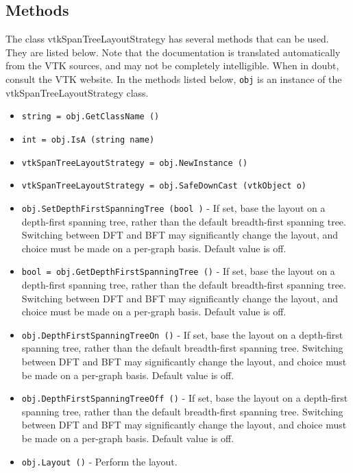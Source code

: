 \subsection{Methods}

The class vtkSpanTreeLayoutStrategy has several methods that can be used.
  They are listed below.
Note that the documentation is translated automatically from the VTK sources,
and may not be completely intelligible.  When in doubt, consult the VTK website.
In the methods listed below, \verb|obj| is an instance of the vtkSpanTreeLayoutStrategy class.
\begin{itemize}
\item  \verb|string = obj.GetClassName ()|

\item  \verb|int = obj.IsA (string name)|

\item  \verb|vtkSpanTreeLayoutStrategy = obj.NewInstance ()|

\item  \verb|vtkSpanTreeLayoutStrategy = obj.SafeDownCast (vtkObject o)|

\item  \verb|obj.SetDepthFirstSpanningTree (bool )| -  If set, base the layout on a depth-first spanning tree,
 rather than the default breadth-first spanning tree.
 Switching between DFT and BFT may significantly change
 the layout, and choice must be made on a per-graph basis.
 Default value is off.

\item  \verb|bool = obj.GetDepthFirstSpanningTree ()| -  If set, base the layout on a depth-first spanning tree,
 rather than the default breadth-first spanning tree.
 Switching between DFT and BFT may significantly change
 the layout, and choice must be made on a per-graph basis.
 Default value is off.

\item  \verb|obj.DepthFirstSpanningTreeOn ()| -  If set, base the layout on a depth-first spanning tree,
 rather than the default breadth-first spanning tree.
 Switching between DFT and BFT may significantly change
 the layout, and choice must be made on a per-graph basis.
 Default value is off.

\item  \verb|obj.DepthFirstSpanningTreeOff ()| -  If set, base the layout on a depth-first spanning tree,
 rather than the default breadth-first spanning tree.
 Switching between DFT and BFT may significantly change
 the layout, and choice must be made on a per-graph basis.
 Default value is off.

\item  \verb|obj.Layout ()| -  Perform the layout.

\end{itemize}
